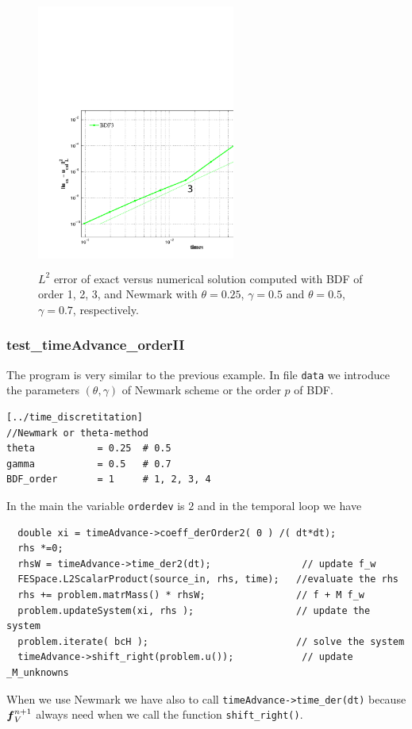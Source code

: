 \documentclass[english,a4paper]{article}
\newcommand{\fbf}{\text{\mbox{\boldmath $f$}}}
\begin{document}
\begin{figure}[!h]
\centering
\includegraphics[width=6.5cm, height=9cm]{figures/P21_order3.pdf}
\caption{$L^2$ error of exact versus numerical solution computed with
  BDF of order 1, 2, 3, and Newmark with
$\theta=0.25$, $\gamma=0.5$ and $\theta=0.5$, $\gamma=0.7$, respectively.  }\label{acc2}
\end{figure}
\clearpage
\newpage
\subsubsection{test\_timeAdvance\_orderII}
The program is very similar to the previous example.
In file \verb"data" we introduce the parameters $(\theta, \gamma)$ of
Newmark scheme or the order $p$ of BDF.
\begin{verbatim}
[../time_discretitation]
//Newmark or theta-method
theta           = 0.25  # 0.5
gamma           = 0.5   # 0.7
BDF_order       = 1     # 1, 2, 3, 4
\end{verbatim}
In the main the variable \verb"orderdev" is $2$ and in the temporal
loop we have
\begin{verbatim}
  double xi = timeAdvance->coeff_derOrder2( 0 ) /( dt*dt);
  rhs *=0;
  rhsW = timeAdvance->time_der2(dt);                // update f_w
  FESpace.L2ScalarProduct(source_in, rhs, time);   //evaluate the rhs
  rhs += problem.matrMass() * rhsW;                // f + M f_w
  problem.updateSystem(xi, rhs );                  // update the system
  problem.iterate( bcH );                          // solve the system
  timeAdvance->shift_right(problem.u());            // update _M_unknowns
\end{verbatim}
 When we use Newmark we have also to call \verb"timeAdvance->time_der(dt)" because $\fbf_V^{n+1}$ always need when we call
 the function \verb"shift_right()".
\end{document}
